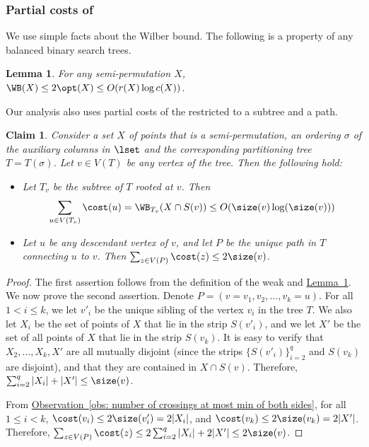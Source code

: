 \documentclass[11pt]{article}
\numberwithin{equation}{section}
\newtheorem{lemma}[theorem]{Lemma}
\newtheorem{claim}[theorem]{Claim}
\theoremstyle{definition}
\theoremstyle{plain}
\newcommand{\expref}[2]{\hyperref[#2]{#1~\ref{#2}}}
\begin{document}
\subsubsection{Partial costs of \WBone}

We use simple facts about the Wilber bound. The following is a property of any balanced binary search trees. 

\begin{lemma}\label{cor: upper bound on WB}
	For any semi-permutation $X$, 
	$\WB(X)\leq 2\opt(X) \leq O(r(X) \log c(X))$.
\end{lemma}

Our analysis also uses partial costs of the \WBone restricted to a subtree and a path. 

\begin{claim}\label{claim: bounds on WB for path and subtree}
Consider a set $X$ of points that is a semi-permutation, an ordering $\sigma$ of the auxiliary columns in $\lset$ and the corresponding partitioning tree $T=T(\sigma)$.  
%
 Let $v\in V(T)$ be any vertex of the tree. Then the following hold:
	\begin{itemize}
\item Let $T_v$ be the %
subtree   %
of $T$ rooted at $v$. Then $$\sum_{u\in V(T_v)}\cost(u) = \WB_{T_v}(X \cap S(v)) \leq O(\size(v)\log(\size(v)))$$
		\item Let $u$ be any descendant vertex of $v$, and let $P$ be the unique path in $T$ connecting $u$ to $v$. Then $\sum_{z\in V(P)}\cost(z)\leq 2\size(v)$.
	\end{itemize}
\end{claim}

\begin{proof}
    The first assertion follows from the definition of the weak \WBone and \expref{Lemma}{cor: upper bound on WB}. We now prove the second assertion. Denote $P=(v=v_1,v_2,\ldots,v_k=u)$. For all $1<i\leq k$, we let $v'_i$ be the unique sibling of the vertex $v_i$ in the tree $T$. We also let $X_i$ be the set of points of $X$ that lie in the strip $S(v'_i)$, and we let $X'$ be the set of all points of $X$ that lie in the strip $S(v_k)$. 
It is easy to verify that $X_2,\ldots,X_k,X'$ are all mutually disjoint (since the strips $\{S(v'_i)\}_{i=2}^q$ and $S(v_k)$ are disjoint), and that they are contained in $X\cap S(v)$. 
Therefore, $\sum_{i=2}^q|X_i|+|X'|\leq \size(v)$.
	
	From \expref{Observation}{obs: number of crossings at most min of both sides}, for all $1\leq i<k$, $\cost(v_i)\leq 2\size(v'_i)=2|X_i|$, and $\cost(v_k)\leq 2\size(v_k)=2|X'|$. Therefore, $\sum_{z\in V(P)}\cost(z)\leq 2\sum_{i=2}^q|X_i|+2|X'|\leq 2\size(v)$.
\end{proof}
\end{document}
